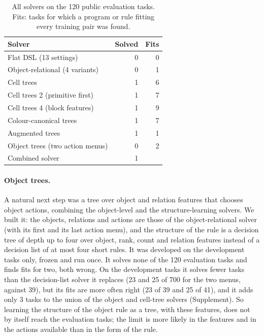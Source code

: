 \documentclass[sigconf,nonacm]{acmart}
\begin{document}
\begin{table}[t]
\caption{All solvers on the 120 public evaluation tasks. Fits: tasks for which a program or rule fitting every training pair was found.}
\label{tab:evalsum}
\footnotesize\setlength{\tabcolsep}{4pt}
\begin{tabular}{@{}>{\raggedright\arraybackslash}p{3.6cm}rr@{}}
\toprule
Solver & Solved & Fits \\
\midrule
Flat DSL (13 settings) & 0 & 0 \\
Object-relational (4 variants) & 0 & 1 \\
Cell trees & 1 & 6 \\
Cell trees 2 (primitive first) & 1 & 7 \\
Cell trees 4 (block features) & 1 & 9 \\
Colour-canonical trees & 1 & 7 \\
Augmented trees & 1 & 1 \\
Object trees (two action menus) & 0 & 2 \\
Combined solver & 1 & \\
\bottomrule
\end{tabular}
\end{table}

\paragraph{Object trees.} A natural next step was a tree over object and relation features that chooses object actions, combining the object-level and the structure-learning solvers. We built it: the objects, relations and actions are those of the object-relational solver (with its first and its last action menu), and the structure of the rule is a decision tree of depth up to four over object, rank, count and relation features instead of a decision list of at most four short rules. It was developed on the development tasks only, frozen and run once. It solves none of the 120 evaluation tasks and finds fits for two, both wrong. On the development tasks it solves fewer tasks than the decision-list solver it replaces (23 and 25 of 700 for the two menus, against 39), but its fits are more often right (23 of 39 and 25 of 41), and it adds only 3 tasks to the union of the object and cell-tree solvers (Supplement). So learning the structure of the object rule as a tree, with these features, does not by itself reach the evaluation tasks; the limit is more likely in the features and in the actions available than in the form of the rule.
\end{document}
